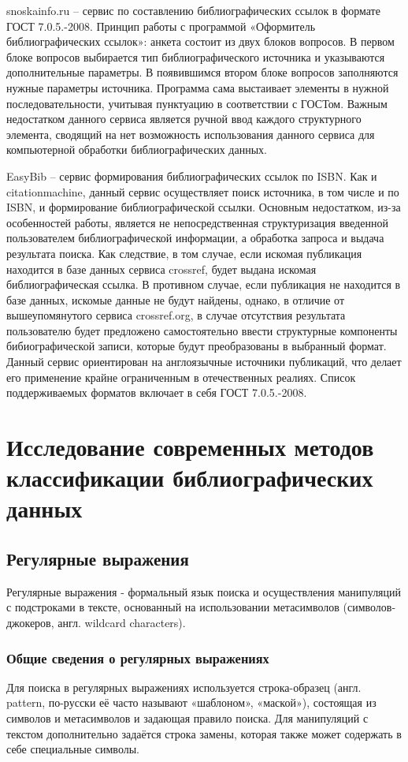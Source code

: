 snoskainfo.ru -- сервис по составлению библиографических ссылок в формате ГОСТ 7.0.5.-2008. Принцип работы с программой «Оформитель библиографических ссылок»: анкета состоит из двух блоков вопросов. В первом блоке вопросов выбирается тип библиографического источника и указываются дополнительные параметры. В появившимся втором блоке вопросов заполняются нужные параметры источника. Программа сама выстаивает элементы в нужной последовательности, учитывая пунктуацию в соответствии с ГОСТом. Важным недостатком данного сервиса является ручной ввод каждого структурного элемента, сводящий на нет возможность использования данного сервиса для компьютерной обработки библиографических данных.

EasyBib -- сервис формирования библиографических ссылок по ISBN. Как и citationmachine, данный сервис осуществляет поиск источника, в том числе и по ISBN, и формирование библиографической ссылки. Основным недостатком, из-за особенностей работы, является не непосредственная структуризация введенной пользователем библиографической информации, а обработка запроса и выдача результата поиска. Как следствие, в том случае, если искомая публикация находится в базе данных сервиса crossref, будет выдана искомая библиографическая ссылка. В противном случае, если публикация не находится в базе данных, искомые данные не будут найдены, однако, в отличие от вышеупомянутого сервиса crossref.org, в случае отсутствия результата пользователю будет предложено самостоятельно ввести структурные компоненты бибиографической записи, которые будут преобразованы в выбранный формат. Данный сервис ориентирован на англоязычные источники публикаций, что делает его применение крайне ограниченным в отечественных реалиях. Список поддерживаемых форматов включает в себя ГОСТ 7.0.5.-2008.

\section{Исследование современных методов классификации библиографических данных}

\subsection{Регулярные выражения}
Регулярные выражения - формальный язык поиска и осуществления манипуляций с подстроками в тексте, основанный на использовании метасимволов (символов-джокеров, англ. wildcard characters).

\subsubsection*{Общие сведения о регулярных выражениях}
Для поиска в регулярных выражениях используется строка-образец (англ. pattern, по-русски её часто называют «шаблоном», «маской»), состоящая из символов и метасимволов и задающая правило поиска. Для манипуляций с текстом дополнительно задаётся строка замены, которая также может содержать в себе специальные символы.

